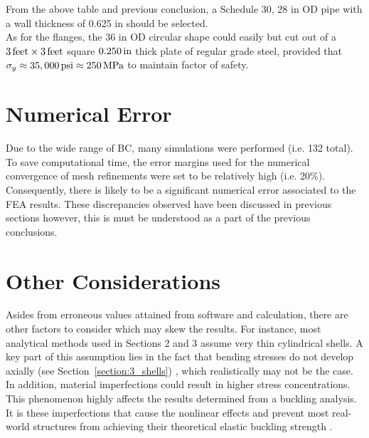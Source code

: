 From the above table and previous conclusion, a Schedule 30, 28 in OD pipe with a wall thickness of 0.625 in should be selected.\\


As for the flanges, the 36 in OD circular shape could easily but cut out of a $3\,\mathrm{feet}\times 3\,\mathrm{feet}$ square $0.250\,\mathrm{in}$ thick plate of regular grade steel, provided that $\sigma_y\approx 35,000 \,\mathrm{psi} \approx 250 \,\mathrm{MPa}$ to maintain factor of safety.


\section{Numerical Error}
\label{subsection:5_numerr}
Due to the wide range of BC, many simulations were performed (i.e. 132 total). To save computational time, the error margins used for the numerical convergence of mesh refinements were set to be relatively high (i.e. 20\%). Consequently, there is likely to be a significant numerical error associated to the FEA results. These discrepancies observed have been discussed in previous sections however, this is must be understood as a part of the previous conclusions.


\section{Other Considerations}
Asides from erroneous values attained from software and calculation, there are other factors to consider which may skew the results. For instance, most analytical methods used in Sections 2 and 3 assume very thin cylindrical shells. A key part of this assumption lies in the fact that bending stresses do not develop axially (see Section~\ref{section:3_shells}) \cite{timoshenko1959theory}, which realistically may not be the case.\\

In addition, material imperfections could result in higher stress concentrations. This phenomenon highly affects the results determined from a buckling analysis. It is these imperfections that cause the nonlinear effects and prevent most real-world structures from achieving their theoretical elastic buckling strength \cite{ANSYS}.

